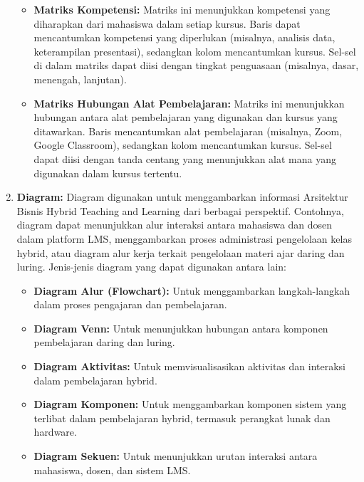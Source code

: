 \begin{enumerate}
\begin{itemize}
		\item \textbf{Matriks Kompetensi:} Matriks ini menunjukkan kompetensi yang diharapkan dari mahasiswa dalam setiap kursus. Baris dapat mencantumkan kompetensi yang diperlukan (misalnya, analisis data, keterampilan presentasi), sedangkan kolom mencantumkan kursus. Sel-sel di dalam matriks dapat diisi dengan tingkat penguasaan (misalnya, dasar, menengah, lanjutan).
		
		\item \textbf{Matriks Hubungan Alat Pembelajaran:} Matriks ini menunjukkan hubungan antara alat pembelajaran yang digunakan dan kursus yang ditawarkan. Baris mencantumkan alat pembelajaran (misalnya, Zoom, Google Classroom), sedangkan kolom mencantumkan kursus. Sel-sel dapat diisi dengan tanda centang yang menunjukkan alat mana yang digunakan dalam kursus tertentu.
	\end{itemize}
	
	\item \textbf{Diagram:}  
	Diagram digunakan untuk menggambarkan informasi Arsitektur Bisnis Hybrid Teaching and Learning dari berbagai perspektif. Contohnya, diagram dapat menunjukkan alur interaksi antara mahasiswa dan dosen dalam platform LMS, menggambarkan proses administrasi pengelolaan kelas hybrid, atau diagram alur kerja terkait pengelolaan materi ajar daring dan luring. Jenis-jenis diagram yang dapat digunakan antara lain:
	\begin{itemize}
		\item \textbf{Diagram Alur (Flowchart):} Untuk menggambarkan langkah-langkah dalam proses pengajaran dan pembelajaran.
		\item \textbf{Diagram Venn:} Untuk menunjukkan hubungan antara komponen pembelajaran daring dan luring.
		\item \textbf{Diagram Aktivitas:} Untuk memvisualisasikan aktivitas dan interaksi dalam pembelajaran hybrid.
		\item \textbf{Diagram Komponen:} Untuk menggambarkan komponen sistem yang terlibat dalam pembelajaran hybrid, termasuk perangkat lunak dan hardware.
		\item \textbf{Diagram Sekuen:} Untuk menunjukkan urutan interaksi antara mahasiswa, dosen, dan sistem LMS.
	\end{itemize}
\end{enumerate}



